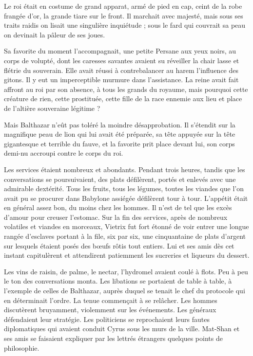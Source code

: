 \documentclass[a4paper, 11pt, oneside, polutonikogreek, french]{article}
\begin{document}
Le roi était en costume de grand apparat, armé de pied en cap, ceint de la robe frangée d'or, la grande tiare sur le front. Il marchait avec majesté, mais sous ses traits raidis on lisait une singulière inquiétude ; sous le fard qui couvrait sa peau on devinait la pâleur de ses joues.

Sa favorite du moment l'accompagnait, une petite Persane aux yeux noirs, au corps de volupté, dont les caresses savantes avaient su réveiller la chair lasse et flétrie du souverain. Elle avait réussi à contrebalancer au harem l'influence des gitons. Il y eut un imperceptible murmure dans l'assistance. La reine avait fait affront au roi par son absence, à tous les grands du royaume, mais pourquoi cette créature de rien, cette prostituée, cette fille de la race ennemie aux lieu et place de l'altière souveraine légitime ?

Mais Balthazar n'eût pas toléré la moindre désapprobation. Il s'étendit sur la magnifique peau de lion qui lui avait été préparée, sa tête appuyée sur la tête gigantesque et terrible du fauve, et la favorite prit place devant lui, son corps demi-nu accroupi contre le corps du roi.

\bigskip
\centerline{\EightStarTaper}
\centerline{\EightStarTaper\EightStarTaper}
\bigskip

Les services étaient nombreux et abondants. Pendant trois heures, tandis que les conversations se poursuivaient, des plats défilèrent, portés et enlevés avec une admirable dextérité. Tous les fruits, tous les légumes, toutes les viandes que l'on avait pu se procurer dans Babylone assiégée défilèrent tour à tour. L'appétit était en général assez bon, du moins chez les hommes. Il n'est de tel que les excès d'amour pour creuser l'estomac. Sur la fin des services, après de nombreux volatiles et viandes en morceaux, Vietrix fut fort étonné de voir entrer une longue rangée d'esclaves portant à la file, six par six, une cinquantaine de plats d'argent sur lesquels étaient posés des bœufs rôtis tout entiers. Lui et ses amis dès cet instant capitulèrent et attendirent patiemment les sucreries et liqueurs du dessert.

\bigskip
\centerline{\EightStarTaper}
\centerline{\EightStarTaper\EightStarTaper}
\bigskip

Les vins de raisin, de palme, le nectar, l'hydromel avaient coulé à flots. Peu à peu le ton des conversations monta. Les libations se portaient de table à table, à l'exemple de celles de Balthazar, auprès duquel se tenait le chef du protocole qui en déterminait l'ordre. La tenue commençait à se relâcher. Les hommes discutèrent bruyamment, violemment sur les événements. Les généraux défendaient leur stratégie. Les politiciens se reprochaient leurs fautes diplomatiques qui avaient conduit Cyrus sous les murs de la ville. Mat-Shan et ses amis se faisaient expliquer par les lettrés étrangers quelques points de philosophie.
\end{document}
